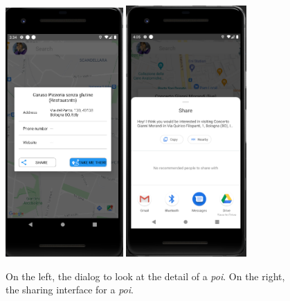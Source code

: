 \documentclass[../../main]{subfiles}
\begin{document}
\begin{figure}[H]
    \centering
    \includegraphics[width=0.4\textwidth]{images/app/poi/poi_map_detail}
    \includegraphics[width=0.41\textwidth]{images/app/share}
    \caption{On the left, the dialog to look at the detail of a \textit{poi}. On the right, the sharing interface for a \textit{poi}.}
\end{figure}
\end{document}
